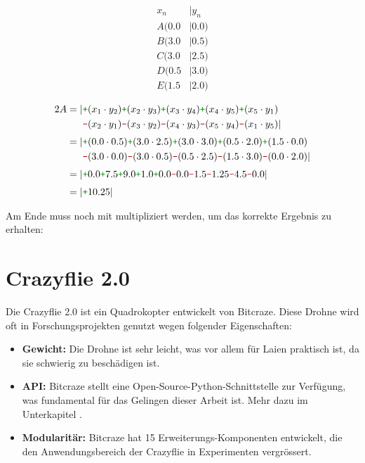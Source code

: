 \begin{minipage}[t]{0.2\textwidth}
    \begin{align*}
        x_n &| y_n \\[3pt]
        A(0.0 &| 0.0) \\
        B(3.0 &| 0.5) \\
        C(3.0 &| 2.5) \\
        D(0.5 &| 3.0) \\
        E(1.5 &| 2.0)
    \end{align*}
\end{minipage}
\vline
\begin{minipage}[t]{0.7\textwidth}
    \begin{align*}
        2A = |&\cp (x_1 \cdot y_2) \cp (x_2 \cdot y_3) \cp (x_3 \cdot y_4) \cp (x_4 \cdot y_5) \cp (x_5 \cdot y_1) \\
        &\cm (x_2 \cdot y_1) \cm (x_3 \cdot y_2) \cm (x_4 \cdot y_3) \cm (x_5 \cdot y_4) \cm (x_1 \cdot y_5)| \\[3pt]
        = |&\cp (0.0 \cdot 0.5) \cp (3.0 \cdot 2.5) \cp (3.0 \cdot 3.0) \cp (0.5 \cdot 2.0) \cp (1.5 \cdot 0.0) \\
        &\cm (3.0 \cdot 0.0) \cm (3.0 \cdot 0.5) \cm (0.5 \cdot 2.5) \cm (1.5 \cdot 3.0) \cm (0.0 \cdot 2.0)| \\[3pt]
        = |&\cp 0.0 \cp 7.5 \cp 9.0 \cp 1.0 \cp 0.0 \cm 0.0 \cm 1.5 \cm 1.25 \cm 4.5 \cm 0.0| \\[3pt]
        = |&\cp 10.25|
    \end{align*}
\end{minipage}

Am Ende muss noch mit  multipliziert werden, um das korrekte Ergebnis zu erhalten: 

\section{Crazyflie 2.0}
Die Crazyflie 2.0 ist ein Quadrokopter entwickelt von Bitcraze.
Diese Drohne wird oft in Forschungsprojekten genutzt wegen folgender Eigenschaften:

\begin{itemize}
    \item \textbf{Gewicht:} Die Drohne ist sehr leicht, was vor allem für Laien praktisch ist, da sie schwierig zu beschädigen ist.
    \item \textbf{API:} Bitcraze stellt eine Open-Source-Python-Schnittstelle zur Verfügung, was fundamental für das Gelingen dieser Arbeit ist. Mehr dazu im Unterkapitel .
    \item \textbf{Modularitär:} Bitcraze hat 15 Erweiterungs-Komponenten entwickelt, die den Anwendungsbereich der Crazyflie in Experimenten vergrössert.
\end{itemize}

